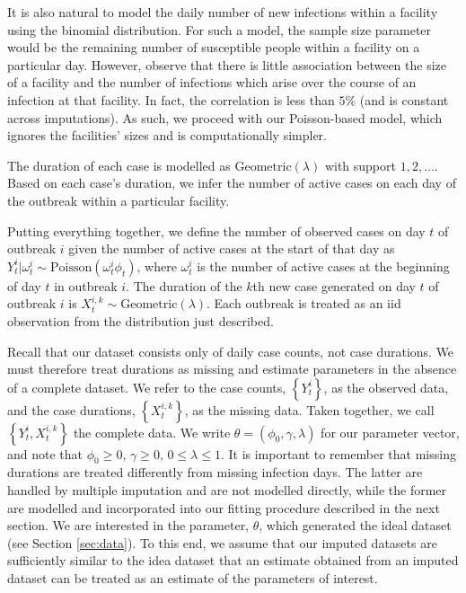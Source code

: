 \documentclass[11pt, oneside]{article}   	%
\begin{document}
It is also natural to model the daily number of new infections within a facility using the binomial distribution. For such a model, the sample size parameter would be the remaining number of susceptible people within a facility on a particular day. However, \citet{Sto22} observe that there is little association between the size of a facility and the number of infections which arise over the course of an infection at that facility. In fact, the correlation is less than $5 \%$ (and is constant across imputations). As such, we proceed with our Poisson-based model, which ignores the facilities' sizes and is computationally simpler.

The duration of each case is modelled as $\mathrm{Geometric}(\lambda)$ with support $1,2,\ldots$. Based on each case's duration, we infer the number of active cases on each day of the outbreak within a particular facility. 

Putting everything together, we define the number of observed cases on day $t$ of outbreak $i$ given the number of active cases at the start of that day as $Y_t^i | \omega_t^i \sim \mathrm{Poisson}(\omega_t^i \phi_t)$, where $\omega_t^i$ is the number of active cases at the beginning of day $t$ in outbreak $i$. The duration of the $k$th new case generated on day $t$ of outbreak $i$ is $X_t^{i,k} \sim \mathrm{Geometric}(\lambda)$. Each outbreak is treated as an iid observation from the distribution just described.

Recall that our dataset consists only of daily case counts, not case durations. We must therefore treat durations as missing and estimate parameters in the absence of a complete dataset. We refer to the case counts, $\left\{ Y_t^i \right\}$, as the observed data, and the case durations, $\left\{ X_t^{i,k} \right\}$, as the missing data. Taken together, we call $\left\{Y_t^i, X_t^{i,k} \right\}$ the complete data. We write $\theta = (\phi_0, \gamma, \lambda)$ for our parameter vector, and note that $\phi_0 \geq 0$, $\gamma \geq 0$, $0 \leq \lambda \leq 1$. It is important to remember that missing durations are treated differently from missing infection days. The latter are handled by multiple imputation and are not modelled directly, while the former are modelled and incorporated into our fitting procedure described in the next section. We are interested in the parameter, $\theta$, which generated the ideal dataset (see Section \ref{sec:data}). To this end, we assume that our imputed datasets are sufficiently similar to the idea dataset that an estimate obtained from an imputed dataset can be treated as an estimate of the parameters of interest.
\end{document}
